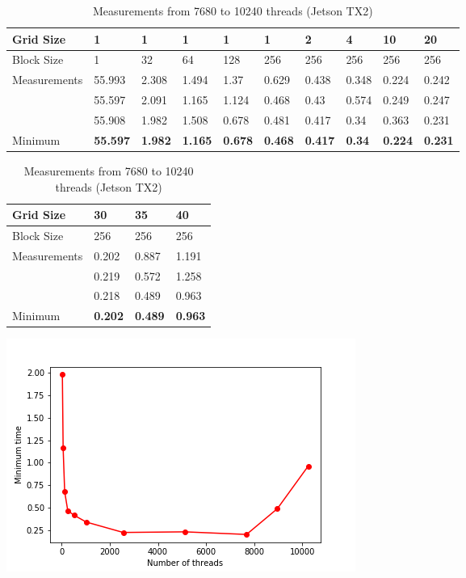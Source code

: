 \documentclass[12pt]{article}
\begin{document}
\begin{table}[]
\begin{center}
\begin{tabular}{|l|l|l|l|l|l|l|l|l|l|}
\hline
Grid Size & 1 & 1 & 1 & 1 & 1 & 2 & 4 & 10 & 20 \\ \hline
Block Size & 1 & 32 & 64 & 128 & 256 & 256 & 256 & 256 & 256 \\ \hline
Measurements & 55.993 & 2.308 & 1.494 & 1.37 & 0.629 & 0.438 & 0.348 & 0.224 & 0.242 \\ \hline
 & 55.597 & 2.091 & 1.165 & 1.124 & 0.468 & 0.43 & 0.574 & 0.249 & 0.247 \\ \hline
 & 55.908 & 1.982 & 1.508 & 0.678 & 0.481 & 0.417 & 0.34 & 0.363 & 0.231 \\ \hline
Minimum & \textbf{55.597} & \textbf{1.982} & \textbf{1.165} & \textbf{0.678} & \textbf{0.468} & \textbf{0.417} & \textbf{0.34} & \textbf{0.224} & \textbf{0.231} \\ \hline
\end{tabular}
\end{center}
\caption{Measurements from 1 to 5120 threads (Jetson TX2)}

\begin{center}
\begin{tabular}{|l|l|l|l|}
\hline
Grid Size & 30 & 35 & 40 \\ \hline
Block Size & 256 & 256 & 256 \\ \hline
Measurements & 0.202 & 0.887 & 1.191 \\ \hline
 & 0.219 & 0.572 & 1.258 \\ \hline
 & 0.218 & 0.489 & 0.963 \\ \hline
Minimum & \textbf{0.202} & \textbf{0.489} & \textbf{0.963} \\ \hline
\end{tabular}
\end{center}
\caption{Measurements from 7680 to 10240 threads (Jetson TX2)}
\end{table}

\begin{center}
	\includegraphics[scale=0.8]{images/threads_vs_time}
\end{center}
\end{document}
